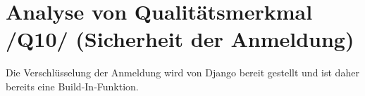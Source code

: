 
\section{Analyse von Qualitätsmerkmal /Q10/ (Sicherheit der Anmeldung)}
Die Verschlüsselung der Anmeldung wird von Django bereit gestellt und ist daher
bereits eine Build-In-Funktion. 
